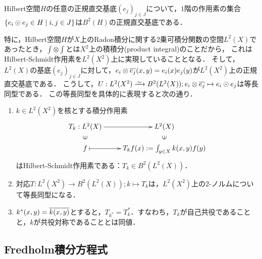 \documentclass[uplatex,dvipdfmx]{jsreport}
\begin{document}
\begin{proposition}
    Hilbert空間$H$の任意の正規直交基底$(e_j)_{j\in J}$について，$1$階の作用素の集合$\left\{e_i\odot e_j\in H\mid i,j\in J\right\}$は$B^2(H)$の正規直交基底である．
\end{proposition}
\begin{remarks}
    特に，Hilbert空間$H$が$X$上のRadon積分に関する2乗可積分関数の空間$L^2(X)$であったとき，$\int\otimes\int$とは$X^2$上の積積分(product integral)のことだから，
    これはHilbert-Schmidt作用素を$L^2(X^2)$上に実現していることとなる．
    そして，$L^2(X)$の基底$(e_j)_{j\in J}$に対して，$e_i\otimes\overline{e_j}(x,y)=e_i(x)e_j(y)$が$L^2(X^2)$上の正規直交基底である．
    こうして，$U:L^2(X^2)\iso B^2(L^2(X));e_i\otimes\o{e_j}\mapsto e_i\odot e_j$は等長同型である．
    この等長同型を具体的に表現すると次の通り．
\end{remarks}

\begin{proposition}\mbox{}
    \begin{enumerate}
        \item $k\in L^2(X^2)$を核とする積分作用素
        \[\xymatrix@R-2pc{
            T_k:L^2(X)\ar[r]&L^2(X)\\
            \rotatebox[origin=c]{90}{$\in$}&\rotatebox[origin=c]{90}{$\in$}\\
            f\ar@{|->}[r]&T_kf(x):=\int_{y\in X}k(x,y)f(y)
        }\]
        はHilbert-Schmidt作用素である：$T_k\in B^2(L^2(X))$．
        \item 対応$T:L^2(X^2)\to B^2(L^2(X));k\mapsto T_k$は，$L^2(X^2)$上の2-ノルムについて等長同型になる．
        \item $k^*(x,y)=\overline{k(x,y)}$とすると，$T_{k^*}=T^*_k$．すなわち，$T_k$が自己共役であることと，$k$が共役対称であることとは同値．
    \end{enumerate}
\end{proposition}

\subsection{Fredholm積分方程式}
\end{document}
